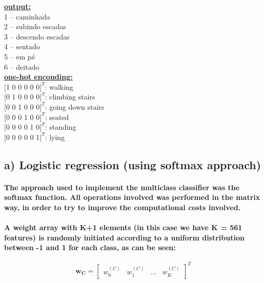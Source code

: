 \documentclass[a4paper]{article}    %
\begin{document}
\medskip
\begin{center}
    \begin{minipage}{.4\textwidth}
        \underline{\textbf{output:}}\medskip\\
        1 – caminhada\\
        2 – subindo escadas\\
        3 – descendo escadas\\
        4 – sentado\\
        5 – em pé\\
        6 – deitado\\[3mm]
        \underline{\textbf{one-hot enconding:}}\medskip\\
        $[$1 0 0 0 0 0$]^T$: walking\\
        $[$0 1 0 0 0 0$]^T$: climbing stairs\\
        $[$0 0 1 0 0 0$]^T$: going down stairs\\
        $[$0 0 0 1 0 0$]^T$: seated\\
        $[$0 0 0 0 1 0$]^T$: standing\\
        $[$0 0 0 0 0 1$]^T$: lying
    \end{minipage}
\end{center}

\subsection{a) Logistic regression (using softmax approach)}

\paragraph{The approach used to implement the multiclass classifier was the softmax function. All operations involved was performed in the matrix way, in order to try to improve the computational costs involved.}

\paragraph{A weight array with K+1 elements (in this case we have K = 561 features) is randomly initiated according to a uniform distribution between -1 and 1 for each class, as can be seen:}

\[ \boldsymbol{w_C} = \begin{bmatrix} w_0^{(C)} & w_1^{(C)} & ... & w_K^{(C)} \end{bmatrix}^T \]
\end{document}
